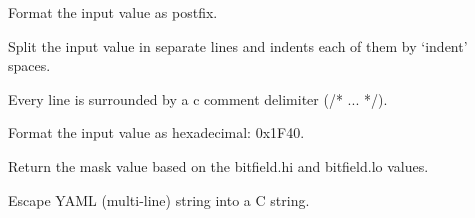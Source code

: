 \documentclass[letterpaper,10pt,english]{sphinxmanual}
\begin{document}
\begin{fulllineitems}
\label{\detokenize{developer:wuppercodegen.filter.append}}
Format the input value as postfix.

\end{fulllineitems}


\begin{fulllineitems}
\label{\detokenize{developer:wuppercodegen.filter.c_comment}}
Split the input value in separate lines and indents each of them by `indent' spaces.

Every line is surrounded by a c comment delimiter (/* ... */).

\end{fulllineitems}


\begin{fulllineitems}
\label{\detokenize{developer:wuppercodegen.filter.c_hex}}
Format the input value as hexadecimal: 0x1F40.

\end{fulllineitems}


\begin{fulllineitems}
\label{\detokenize{developer:wuppercodegen.filter.c_mask}}
Return the mask value based on the bitfield.hi and bitfield.lo values.

\end{fulllineitems}


\begin{fulllineitems}
\label{\detokenize{developer:wuppercodegen.filter.c_string}}
Escape YAML (multi-line) string into a C string.

\end{fulllineitems}
\end{document}

